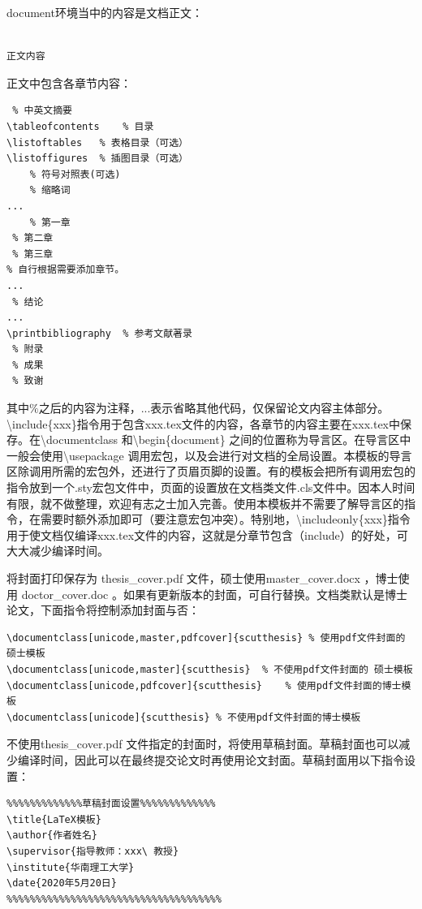 document环境当中的内容是文档正文：
\begin{lstlisting}

正文内容

\end{lstlisting}
正文中包含各章节内容：
\begin{lstlisting}
 % 中英文摘要
\tableofcontents	% 目录
\listoftables	% 表格目录（可选）
\listoffigures	% 插图目录（可选）
	% 符号对照表(可选)
 	% 缩略词	
...
	% 第一章
 % 第二章
 % 第三章
% 自行根据需要添加章节。
...
 % 结论
...
\printbibliography	% 参考文献著录
 % 附录
 % 成果
 % 致谢
\end{lstlisting}
其中$\%$之后的内容为注释，...表示省略其他代码，仅保留论文内容主体部分。\textbackslash{}include\{xxx\}指令用于包含xxx.tex文件的内容，各章节的内容主要在xxx.tex中保存。在\textbackslash{}documentclass 和\textbackslash{}begin\{document\} 之间的位置称为导言区。在导言区中一般会使用\textbackslash{}usepackage 调用宏包，以及会进行对文档的全局设置。本模板的导言区除调用所需的宏包外，还进行了页眉页脚的设置。有的模板会把所有调用宏包的指令放到一个.sty宏包文件中，页面的设置放在文档类文件.cls文件中。因本人时间有限，就不做整理，欢迎有志之士加入完善。使用本模板并不需要了解导言区的指令，在需要时额外添加即可（要注意宏包冲突）。特别地，\textbackslash{}includeonly\{xxx\}指令用于使文档仅编译xxx.tex文件的内容，这就是分章节包含（include）的好处，可大大减少编译时间。

将封面打印保存为 thesis\_cover.pdf 文件，硕士使用master\_cover.docx ，博士使用 doctor\_cover.doc 。如果有更新版本的封面，可自行替换。文档类默认是博士论文，下面指令将控制添加封面与否：
\begin{lstlisting}
\documentclass[unicode,master,pdfcover]{scutthesis}	% 使用pdf文件封面的 硕士模板
\documentclass[unicode,master]{scutthesis}	% 不使用pdf文件封面的 硕士模板
\documentclass[unicode,pdfcover]{scutthesis}	% 使用pdf文件封面的博士模板
\documentclass[unicode]{scutthesis}	% 不使用pdf文件封面的博士模板
\end{lstlisting}
不使用thesis\_cover.pdf 文件指定的封面时，将使用草稿封面。草稿封面也可以减少编译时间，因此可以在最终提交论文时再使用论文封面。草稿封面用以下指令设置：
\begin{lstlisting}
%%%%%%%%%%%%%草稿封面设置%%%%%%%%%%%%%	
\title{LaTeX模板}	
\author{作者姓名}	
\supervisor{指导教师：xxx\ 教授}	
\institute{华南理工大学}	
\date{2020年5月20日}
%%%%%%%%%%%%%%%%%%%%%%%%%%%%%%%%%%%%%
\end{lstlisting}
